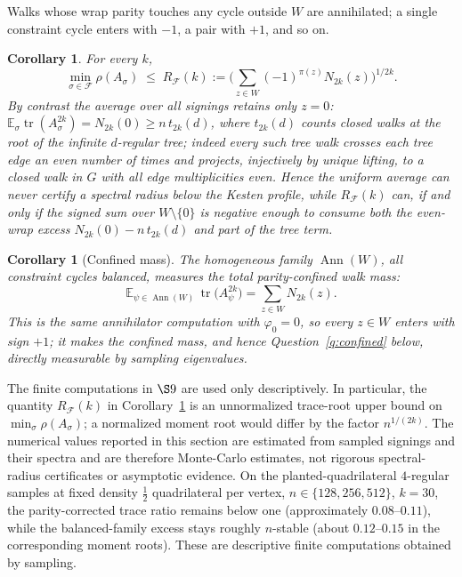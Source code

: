 \documentclass[11pt]{article}
\newtheorem{corollary}[lemma]{Corollary}
\theoremstyle{remark}
\newcommand{\rhomax}{\rho}
\DeclareMathOperator{\tr}{tr}
\begin{document}
Walks whose wrap parity touches any cycle outside $W$ are annihilated;
a single constraint cycle enters with $-1$, a pair with $+1$, and so on.

\begin{corollary}\label{cor:certificate}
For every $k$,
\[
\min_{\sigma\in\mathcal F}\rhomax(A_\sigma)\;\le\;
R_{\mathcal F}(k):=\Big(\sum_{z\in W}(-1)^{\pi(z)}N_{2k}(z)\Big)^{1/2k}.
\]
By contrast the average over all signings retains only $z=0$:
$\mathbb E_\sigma\tr(A_\sigma^{2k})=N_{2k}(0)\ge n\,t_{2k}(d)$, where
$t_{2k}(d)$ counts closed walks at the root of the infinite $d$-regular
tree; indeed every such tree walk crosses each tree edge an even number
of times and projects, injectively by unique lifting, to a closed walk
in $G$ with all edge multiplicities even. Hence the uniform average can
never certify a spectral radius below the Kesten profile, while
$R_{\mathcal F}(k)$ can, if and only if the signed sum over
$W\setminus\{0\}$ is negative enough to consume both the even-wrap
excess $N_{2k}(0)-n\,t_{2k}(d)$ and part of the tree term.
\end{corollary}

\begin{corollary}[Confined mass]\label{cor:balanced}
The homogeneous family $\operatorname{Ann}(W)$, all constraint cycles
\emph{balanced}, measures the total parity-confined walk mass:
\[
\mathbb E_{\psi\in\operatorname{Ann}(W)}\,\tr\!\big(A_\psi^{2k}\big)
=\sum_{z\in W}N_{2k}(z).
\]
This is the same annihilator computation with $\varphi_0=0$, so every
$z\in W$ enters with sign $+1$; it makes the confined mass, and hence
Question~\ref{q:confined} below, directly measurable by sampling
eigenvalues.
\end{corollary}

The finite computations in $\S9$ are used only descriptively. In particular, the
quantity $R_{\mathcal F}(k)$ in Corollary~\ref{cor:certificate} is an unnormalized
trace-root upper bound on $\min_\sigma\rhomax(A_\sigma)$; a normalized moment root would
differ by the factor $n^{1/(2k)}$. The numerical values reported in this section are estimated
from sampled signings and their spectra and are therefore Monte-Carlo estimates, not rigorous
spectral-radius certificates or asymptotic evidence. On the planted-quadrilateral $4$-regular
samples at fixed density $\tfrac12$ quadrilateral per vertex,
$n\in\{128,256,512\}$, $k=30$, the parity-corrected trace ratio remains below one
(approximately $0.08$--$0.11$), while the balanced-family excess stays roughly $n$-stable
(about $0.12$--$0.15$ in the corresponding moment roots). These are descriptive finite
computations obtained by sampling.
\end{document}
